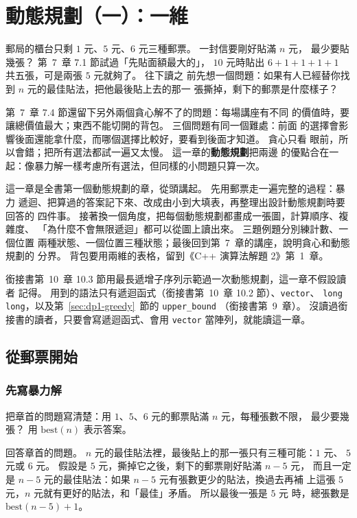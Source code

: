 \chapter{動態規劃（一）：一維}
\label{ch:dp1d}

郵局的櫃台只剩 $1$ 元、$5$ 元、$6$ 元三種郵票。 一封信要剛好貼滿 $n$ 元，
最少要貼幾張？ 第~7~章 7.1 節試過「先貼面額最大的」，
$10$ 元時貼出 $6 + 1 + 1 + 1 + 1$ 共五張，可是兩張 $5$ 元就夠了。 往下讀之
前先想一個問題：如果有人已經替你找到 $n$ 元的最佳貼法，把他最後貼上去的那一
張撕掉，剩下的郵票是什麼樣子？

第~7~章 7.4 節還留下另外兩個貪心解不了的問題：每場講座有不同
的價值時，要讓總價值最大；東西不能切開的背包。 三個問題有同一個難處：前面
的選擇會影響後面還能拿什麼，而哪個選擇比較好，要看到後面才知道。 貪心只看
眼前，所以會錯；把所有選法都試一遍又太慢。 這一章的\textbf{動態規劃}把兩邊
的優點合在一起：像暴力解一樣考慮所有選法，但同樣的小問題只算一次。

這一章是全書第一個動態規劃的章，從頭講起。 先用郵票走一遍完整的過程：暴力
遞迴、把算過的答案記下來、改成由小到大填表，再整理出設計動態規劃時要回答的
四件事。 接著換一個角度，把每個動態規劃都畫成一張圖，計算順序、複雜度、
「為什麼不會無限遞迴」都可以從圖上讀出來。 三題例題分別練計數、一個位置
兩種狀態、一個位置三種狀態；最後回到第~7~章的講座，說明貪心和動態規劃的
分界。 背包要用兩維的表格，留到《C++ 演算法解題 2》第~1~章。

銜接書第~10~章 10.3 節用最長遞增子序列示範過一次動態規劃，這一章不假設讀者
記得。 用到的語法只有遞迴函式（銜接書第~10~章 10.2 節）、\texttt{vector}、
\texttt{long long}，以及第~\ref{sec:dp1-greedy}~節的 \texttt{upper\_bound}
（銜接書第~9~章）。 沒讀過銜接書的讀者，只要會寫遞迴函式、會用
\texttt{vector} 當陣列，就能讀這一章。

\section{從郵票開始}
\label{sec:dp1-stamps}

\subsection{先寫暴力解}

把章首的問題寫清楚：用 $1$、$5$、$6$ 元的郵票貼滿 $n$ 元，每種張數不限，
最少要幾張？ 用 $\mathrm{best}(n)$ 表示答案。

回答章首的問題。 $n$ 元的最佳貼法裡，最後貼上的那一張只有三種可能：$1$ 元、
$5$ 元或 $6$ 元。 假設是 $5$ 元，撕掉它之後，剩下的郵票剛好貼滿 $n - 5$ 元，
而且一定是 $n - 5$ 元的最佳貼法：如果 $n - 5$ 元有張數更少的貼法，換過去再補
上這張 $5$ 元，$n$ 元就有更好的貼法，和「最佳」矛盾。 所以最後一張是 $5$ 元
時，總張數是 $\mathrm{best}(n - 5) + 1$。

